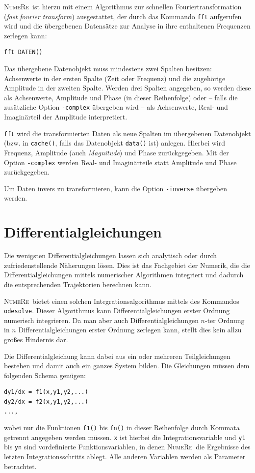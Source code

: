 \documentclass[DIV=14,headsepline,footsepline]{scrbook}
\newcommand{\NR}{\textsc{Nu\-me\-Re}}
\begin{document}
				\NR\ ist hierzu mit einem Algorithmus zur schnellen Fouriertransformation (\emph{fast fourier transform}) ausgestattet, der durch das Kommando \lstinline+fft+ aufgerufen wird und die übergebenen Datensätze zur Analyse in ihre enthaltenen Frequenzen zerlegen kann:
				\begin{lstlisting}
fft DATEN()
				\end{lstlisting}
				Das übergebene Datenobjekt muss mindestens zwei Spalten besitzen: Achsenwerte in der ersten Spalte (Zeit oder Frequenz) und die zugehörige Amplitude in der zweiten Spalte. Werden drei Spalten angegeben, so werden diese als Achsenwerte, Amplitude und Phase (in dieser Reihenfolge) oder -- falls die zusätzliche Option \lstinline+-complex+ übergeben wird -- als Achsenwerte, Real- und Imaginärteil der Amplitude interpretiert.
				
				\lstinline+fft+ wird die transformierten Daten als neue Spalten im übergebenen Datenobjekt (bzw. in \lstinline+cache()+, falls das Datenobjekt \lstinline+data()+ ist) anlegen. Hierbei wird Frequenz, Amplitude (auch \emph{Magnitude}) und Phase zurückgegeben. Mit der Option \lstinline+-complex+ werden Real- und Imaginärteile statt Amplitude und Phase zurückgegeben.
				
				Um Daten invers zu transformieren, kann die Option \lstinline+-inverse+ übergeben werden.
				
			\section{Differentialgleichungen}
				Die wenigsten Differentialgleichungen lassen sich analytisch oder durch zufriedenstellende Näherungen lösen. Dies ist das Fachgebiet der Numerik, die die Differentialgleichungen mittels numerischer Algorithmen integriert und dadurch die entsprechenden Trajektorien berechnen kann.
				
				\NR\ bietet einen solchen Integrationsalgorithmus mittels des Kommandos \lstinline+odesolve+. Dieser Algorithmus kann Differentialgleichungen erster Ordnung numerisch integrieren. Da man aber auch Differentialgleichungen $n$-ter Ordnung in $n$ Differentialgleichungen erster Ordnung zerlegen kann, stellt dies kein allzu großes Hindernis dar.
				
				Die Differentialgleichung kann dabei aus ein oder mehreren Teilgleichungen bestehen und damit auch ein ganzes System bilden. Die Gleichungen müssen dem folgenden Schema genügen:
				\begin{lstlisting}
dy1/dx = f1(x,y1,y2,...)
dy2/dx = f2(x,y1,y2,...)
...,				
				\end{lstlisting}
				wobei nur die Funktionen \lstinline+f1()+ bis \lstinline+fn()+ in dieser Reihenfolge durch Kommata getrennt angegeben werden müssen. \lstinline+x+ ist hierbei die Integrationsvariable und \lstinline+y1+ bis \lstinline+yn+ sind vordefinierte Funktionsvariablen, in denen \NR\ die Ergebnisse des letzten Integrationsschritts ablegt. Alle anderen Variablen werden als Parameter betrachtet.
	
\end{document}
